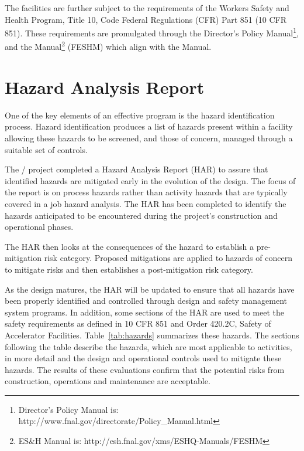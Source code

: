 The \fnal facilities are further subject to the requirements of the
 Workers Safety and Health Program, Title 10, Code Federal
Regulations (CFR) Part 851 (10 CFR 851).  These requirements are
promulgated through the \fnal Director's Policy Manual\footnote{\fnal
  Director's Policy Manual is:
  http://www.fnal.gov/directorate/Policy\_Manual.html}, and the \fnal
{} Manual\footnote{\fnal ES\&H Manual is:
  http://esh.fnal.gov/xms/ESHQ-Manuals/FESHM} (FESHM) which align with
the \surf {} Manual.

\section{Hazard Analysis Report}

One of the key elements of an effective  program is the hazard
identification process. Hazard identification produces a list of
hazards present within a facility allowing these hazards to be
screened, and those of concern, managed through a suitable set of
controls.

The / project completed a Hazard Analysis Report (HAR) to
assure that identified hazards are mitigated early in the evolution of
the design.  The focus of the report is on process hazards rather than
activity hazards that are typically covered in a job hazard analysis.
The HAR has been completed to identify the hazards anticipated to be
encountered during the project's construction and operational phases.

The HAR then looks at the consequences of the hazard to establish a
pre-mitigation risk category. Proposed mitigations are applied to
hazards of concern to mitigate risks and then establishes a
post-mitigation risk category.

As the  design matures, the HAR will be updated to ensure
that all hazards have been properly identified and controlled through
design and safety management system programs.  In addition, some
sections of the HAR are used to meet the safety requirements as
defined in 10 CFR 851 and  Order 420.2C, Safety of
Accelerator Facilities.  Table~\ref{tab:hazards} summarizes these
hazards.  The sections following the table describe the hazards, which
are most applicable to  activities, in more detail and the
design and operational controls used to mitigate these hazards. The
results of these evaluations confirm that the potential risks from
construction, operations and maintenance are acceptable.

